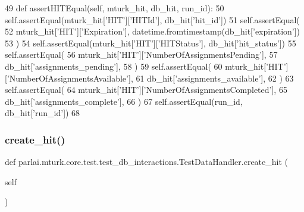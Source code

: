 \begin{DoxyCode}
49     \textcolor{keyword}{def }assertHITEqual(self, mturk\_hit, db\_hit, run\_id):
50         self.assertEqual(mturk\_hit[\textcolor{stringliteral}{'HIT'}][\textcolor{stringliteral}{'HITId'}], db\_hit[\textcolor{stringliteral}{'hit\_id'}])
51         self.assertEqual(
52             mturk\_hit[\textcolor{stringliteral}{'HIT'}][\textcolor{stringliteral}{'Expiration'}], datetime.fromtimestamp(db\_hit[\textcolor{stringliteral}{'expiration'}])
53         )
54         self.assertEqual(mturk\_hit[\textcolor{stringliteral}{'HIT'}][\textcolor{stringliteral}{'HITStatus'}], db\_hit[\textcolor{stringliteral}{'hit\_status'}])
55         self.assertEqual(
56             mturk\_hit[\textcolor{stringliteral}{'HIT'}][\textcolor{stringliteral}{'NumberOfAssignmentsPending'}],
57             db\_hit[\textcolor{stringliteral}{'assignments\_pending'}],
58         )
59         self.assertEqual(
60             mturk\_hit[\textcolor{stringliteral}{'HIT'}][\textcolor{stringliteral}{'NumberOfAssignmentsAvailable'}],
61             db\_hit[\textcolor{stringliteral}{'assignments\_available'}],
62         )
63         self.assertEqual(
64             mturk\_hit[\textcolor{stringliteral}{'HIT'}][\textcolor{stringliteral}{'NumberOfAssignmentsCompleted'}],
65             db\_hit[\textcolor{stringliteral}{'assignments\_complete'}],
66         )
67         self.assertEqual(run\_id, db\_hit[\textcolor{stringliteral}{'run\_id'}])
68 
\end{DoxyCode}
\mbox{\label{classparlai_1_1mturk_1_1core_1_1test_1_1test__db__interactions_1_1TestDataHandler_a7afbef0465fe007d9dccaabd8183d56f}} 
\subsubsection{\texorpdfstring{create\+\_\+hit()}{create\_hit()}}
{\footnotesize\ttfamily def parlai.\+mturk.\+core.\+test.\+test\+\_\+db\+\_\+interactions.\+Test\+Data\+Handler.\+create\+\_\+hit (\begin{DoxyParamCaption}\item[{}]{self }\end{DoxyParamCaption})}



